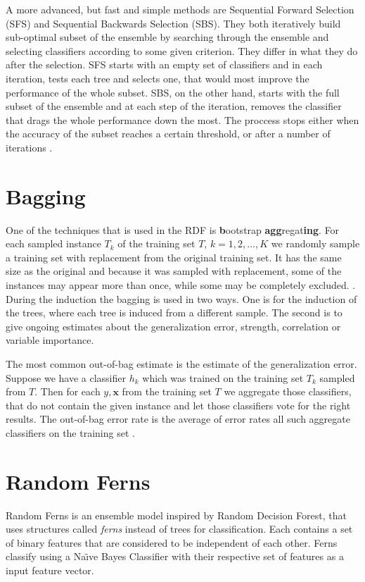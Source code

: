 \documentclass[thesis=B,english]{FITthesis}[2012/10/20]
\begin{document}
	A more advanced, but fast and simple methods are Sequential Forward Selection (SFS) and Sequential Backwards Selection (SBS). They both iteratively build sub-optimal subset of the ensemble by searching through the ensemble and selecting classifiers according to some given criterion. They differ in what they do after the selection. SFS starts with an empty set of classifiers and in each iteration, tests each tree and selects one, that would most improve the performance of the whole subset. SBS, on the other hand, starts with the full subset of the ensemble and at each step of the iteration, removes the classifier that drags the whole performance down the most. \cite{SELECTION_OF_DT} The proccess stops either when the accuracy of the subset reaches a certain threshold, or after a number of iterations \cite{DESIGNING-MULTIPLE-CLASS-SYS}. 

	\section{Bagging}
	One of the techniques that is used in the RDF is \textbf{b}ootstrap \textbf{agg}regat\textbf{ing}. For each sampled instance \(T_k\) of the training set \(T\), \(k = 1, 2, \dots, K \) we randomly sample a training set with replacement from the original training set. It has the same size as the original and because it was sampled with replacement, some of the instances may appear more than once, while some may be completely excluded. \cite{quinlan1996bagging}. During the induction the bagging is used in two ways. One is for the induction of the trees, where each tree is induced from a different sample. The second is to give ongoing estimates about the generalization error, strength, correlation or variable importance.

	The most common out-of-bag estimate is the estimate of the generalization error. Suppose we have a classifier \(h_k\) which was trained on the training set \(T_k\) sampled from \(T\). Then for each \(y,\mathbf{x}\) from the training set \(T\) we aggregate those classifiers, that do not contain the given instance and let those classifiers vote for the right results. The out-of-bag error rate is the average of error rates all such aggregate classifiers on the training set \cite{breiman1996out}.

	\section{Random Ferns}
	Random Ferns \cite{ozuysal2010fast,ozuysal2007fast} is an ensemble model inspired by Random Decision Forest, that uses structures called \emph{ferns} instead of trees for classification. Each contains a set of binary features that are considered to be independent of each other. Ferns classify using a Na\"{\i}ve Bayes Classifier with their respective set of features as a input feature vector.
\end{document}
